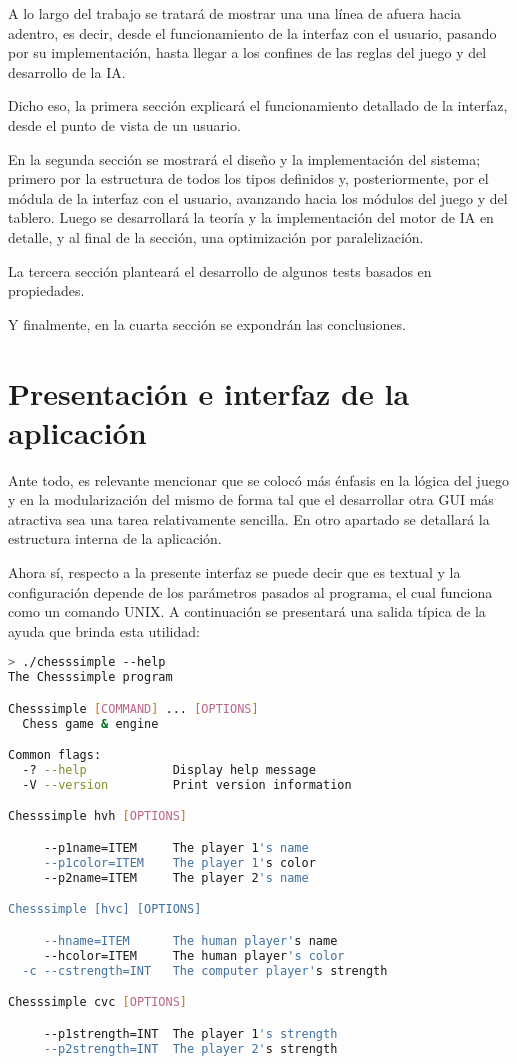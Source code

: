 \documentclass{llncs}
\begin{document}
A lo largo del trabajo se tratará de mostrar una una línea de afuera hacia adentro, es decir, desde el funcionamiento de la interfaz con el usuario, pasando por su implementación, hasta llegar a los confines de las reglas del juego y del desarrollo de la IA.

Dicho eso, la primera sección explicará el funcionamiento detallado de la interfaz, desde el punto de vista de un usuario.

En la segunda sección se mostrará el diseño y la implementación del sistema; primero por la estructura de todos los tipos definidos y, posteriormente, por el módula de la interfaz con el usuario, avanzando hacia los módulos del juego y del tablero. Luego se desarrollará la teoría y la implementación del motor de IA en detalle, y al final de la sección, una optimización por paralelización.

La tercera sección planteará el desarrollo de algunos tests basados en propiedades.

Y finalmente, en la cuarta sección se expondrán las conclusiones.

\section{Presentación e interfaz de la aplicación}

Ante todo, es relevante mencionar que se colocó más énfasis en la lógica del juego y en la modularización del mismo de forma tal que el desarrollar otra GUI más atractiva sea una tarea relativamente sencilla. En otro apartado se detallará la estructura interna de la aplicación.

Ahora sí, respecto a la presente interfaz se puede decir que es textual y la configuración depende de los parámetros pasados al programa, el cual funciona como un comando UNIX. A continuación se presentará una salida típica de la ayuda que brinda esta utilidad:

\begin{lstlisting}[frame=single, language=bash, caption=Ayuda de la aplicación, label={lst:ayuda_programa}]
> ./chesssimple --help
The Chesssimple program

Chesssimple [COMMAND] ... [OPTIONS]
  Chess game & engine

Common flags:
  -? --help            Display help message
  -V --version         Print version information

Chesssimple hvh [OPTIONS]

     --p1name=ITEM     The player 1's name
     --p1color=ITEM    The player 1's color
     --p2name=ITEM     The player 2's name

Chesssimple [hvc] [OPTIONS]

     --hname=ITEM      The human player's name
     --hcolor=ITEM     The human player's color
  -c --cstrength=INT   The computer player's strength

Chesssimple cvc [OPTIONS]

     --p1strength=INT  The player 1's strength
     --p2strength=INT  The player 2's strength
\end{lstlisting}
\end{document}
